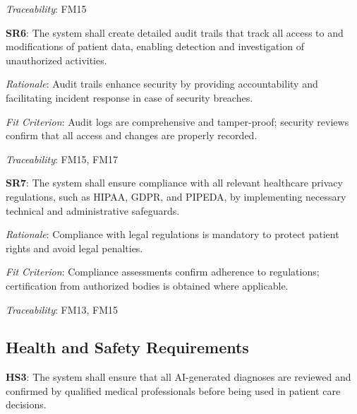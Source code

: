 \documentclass{article}
\begin{document}
\vspace{0.2cm}

\emph{Traceability}: FM15

\vspace{0.5cm}

\textbf{SR6}: The system shall create detailed audit trails that track all access to and modifications of patient data, enabling detection and investigation of unauthorized activities.

\emph{Rationale}: Audit trails enhance security by providing accountability and facilitating incident response in case of security breaches.

\vspace{0.2cm}

\emph{Fit Criterion}: Audit logs are comprehensive and tamper-proof; security reviews confirm that all access and changes are properly recorded.

\vspace{0.2cm}

\emph{Traceability}: FM15, FM17

\vspace{0.5cm}

\textbf{SR7}: The system shall ensure compliance with all relevant healthcare privacy regulations, such as HIPAA, GDPR, and PIPEDA, by implementing necessary technical and administrative safeguards.

\emph{Rationale}: Compliance with legal regulations is mandatory to protect patient rights and avoid legal penalties.

\vspace{0.2cm}

\emph{Fit Criterion}: Compliance assessments confirm adherence to regulations; certification from authorized bodies is obtained where applicable.

\vspace{0.2cm}

\emph{Traceability}: FM13, FM15

\vspace{0.5cm}

\subsection{Health and Safety Requirements}

\textbf{HS3}: The system shall ensure that all AI-generated diagnoses are reviewed and confirmed by qualified medical professionals before being used in patient care decisions.
\end{document}
